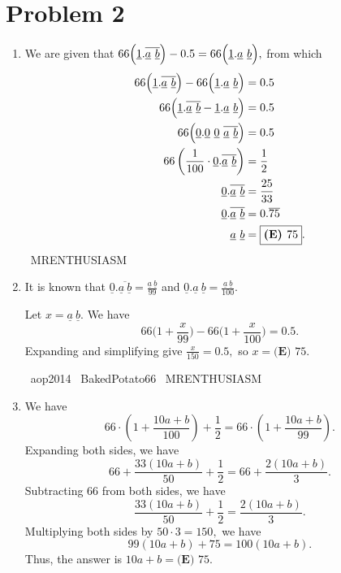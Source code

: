 \documentclass{article}%
\begin{document}
\section*{Problem 2}%
\label{sec:Problem2}%
\begin{enumerate}%
\item%
We are given that $66\Bigl(\underline{1}.\overline{\underline{a} \ \underline{b}}\Bigr)-0.5=66\Bigl(\underline{1}.\underline{a} \ \underline{b}\Bigr),$ from which
\begin{align*} 66\Bigl(\underline{1}.\overline{\underline{a} \ \underline{b}}\Bigr)-66\Bigl(\underline{1}.\underline{a} \ \underline{b}\Bigr)&=0.5 \\ 66\Bigl(\underline{1}.\overline{\underline{a} \ \underline{b}} - \underline{1}.\underline{a} \ \underline{b}\Bigr)&=0.5 \\ 66\Bigl(\underline{0}.\underline{0} \ \underline{0} \ \overline{\underline{a} \ \underline{b}}\Bigr)&=0.5 \\ 66\left(\frac{1}{100}\cdot\underline{0}.\overline{\underline{a} \ \underline{b}}\right)&=\frac12 \\ \underline{0}.\overline{\underline{a} \ \underline{b}}&=\frac{25}{33} \\ \underline{0}.\overline{\underline{a} \ \underline{b}}&=0.\overline{75} \\ \underline{a} \ \underline{b}&=\boxed{\textbf{(E) }75}. \end{align*}
~MRENTHUSIASM

%
\item%
It is known that $\underline{0}.\overline{\underline{a} \ \underline{b}}=\frac{\underline{a} \ \underline{b}}{99}$ and $\underline{0}.\underline{a} \ \underline{b}=\frac{\underline{a} \ \underline{b}}{100}.$

Let $x=\underline{a} \ \underline{b}.$ We have \[66\biggl(1+\frac{x}{99}\biggr)-66\biggl(1+\frac{x}{100}\biggr)=0.5.\] Expanding and simplifying give $\frac{x}{150}=0.5,$ so $x=\boxed{\textbf{(E) }75}.$

~aop2014 ~BakedPotato66 ~MRENTHUSIASM

%
\item%
We have \[66 \cdot \left(1 + \frac{10a+b}{100}\right) + \frac{1}{2} = 66 \cdot \left(1+ \frac{10a+b}{99}\right).\]
Expanding both sides, we have \[66 + \frac{33(10a+b)}{50} + \frac{1}{2} = 66 + \frac{2(10a+b)}{3}.\]
Subtracting $66$ from both sides, we have \[\frac{33(10a+b)}{50} + \frac{1}{2} = \frac{2(10a+b)}{3}.\]
Multiplying both sides by $50 \cdot 3 = 150,$ we have \[99(10a+b) + 75 = 100(10a+b).\]
Thus, the answer is $10a+b = \boxed{\textbf{(E) }75}.$


\end{enumerate}
\end{document}

